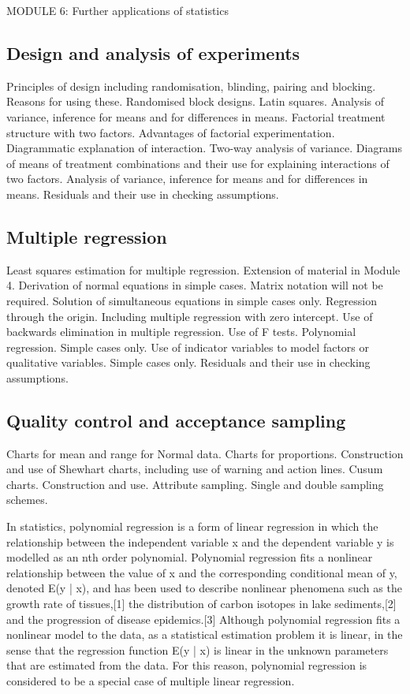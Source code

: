 MODULE 6: Further applications of statistics
\subsection*{Design and analysis of experiments}
Principles of design including randomisation, blinding, pairing and blocking.
Reasons for using these.
Randomised block designs. Latin squares.
Analysis of variance, inference for means and for differences in means.
Factorial treatment structure with two factors. Advantages of factorial experimentation. Diagrammatic explanation of interaction.
Two-way analysis of variance.
Diagrams of means of treatment combinations and their use for explaining interactions of two factors.
Analysis of variance, inference for means and for differences in means.
Residuals and their use in checking assumptions.
\subsection*{Multiple regression}
Least squares estimation for multiple regression.
Extension of material in Module 4. Derivation of normal equations in simple cases. Matrix notation will not be required. Solution of simultaneous equations in simple cases only.
Regression through the origin.
Including multiple regression with zero intercept.
Use of backwards elimination in multiple regression.
Use of F tests.
Polynomial regression.
Simple cases only.
Use of indicator variables to model factors or qualitative variables.
Simple cases only.
Residuals and their use in checking assumptions.
\subsection*{Quality control and acceptance sampling}
Charts for mean and range for Normal data. Charts for proportions.
Construction and use of Shewhart charts, including use of warning and action lines.
Cusum charts.
Construction and use.
Attribute sampling. Single and double sampling schemes.

In statistics, polynomial regression is a form of linear regression in which the relationship between the independent variable x and the dependent variable y is modelled as an nth order polynomial. Polynomial regression fits a nonlinear relationship between the value of x and the corresponding conditional mean of y, denoted E(y | x), and has been used to describe nonlinear phenomena such as the growth rate of tissues,[1] the distribution of carbon isotopes in lake sediments,[2] and the progression of disease epidemics.[3] Although polynomial regression fits a nonlinear model to the data, as a statistical estimation problem it is linear, in the sense that the regression function E(y | x) is linear in the unknown parameters that are estimated from the data. For this reason, polynomial regression is considered to be a special case of multiple linear regression.

